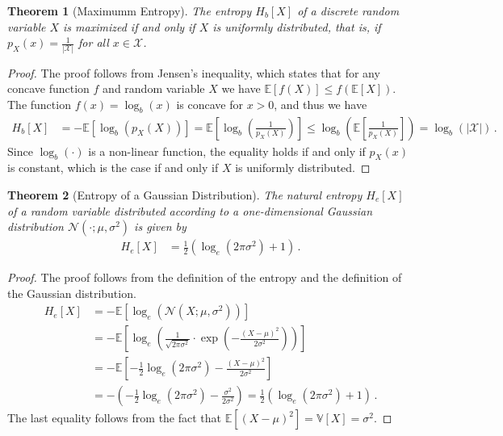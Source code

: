 \documentclass[a4paper]{article}
\newcommand{\Normal}[3]{{\mathcal N} \left({#1};{#2},{#3}\right)}
\newcommand{\expect}[1]{{\mathbb E \left[ {#1} \right]}}
\newcommand{\var}[1]{{\mathbb V \left[ {#1} \right]}}
\newtheorem{theorem}{Theorem}
\theoremstyle{definition}
\begin{document}
\begin{theorem}[Maximumm Entropy]
    The entropy $H_b[X]$ of a discrete random variable $X$ is maximized if and only if $X$ is uniformly distributed, that is, if $p_X(x) = \frac{1}{|\mathcal{X}|}$ for all $x \in \mathcal{X}$.
\end{theorem}
\begin{proof}
    The proof follows from Jensen's inequality, which states that for any concave function $f$ and random variable $X$ we have $\expect{f(X)} \leq f(\expect{X})$. The function $f(x) = \log_b(x)$ is concave for $x > 0$, and thus we have
    \begin{align}
        H_b[X] & = -\expect{\log_b(p_X(X))} = \expect{\log_b\left(\frac{1}{p_X(X)}\right)} \leq \log_b\left(\expect{\frac{1}{p_X(X)}}\right) = \log_b(|\mathcal{X}|) \,.
    \end{align}
    Since $\log_b(\cdot)$ is a non-linear function, the equality holds if and only if $p_X(x)$ is constant, which is the case if and only if $X$ is uniformly distributed.
\end{proof}


\begin{theorem}[Entropy of a Gaussian Distribution]
    The natural entropy $H_e[X]$ of a random variable distributed according to a one-dimensional Gaussian distribution $\Normal{\cdot}{\mu}{\sigma^2}$ is given by
    \begin{align}
        H_e[X] & = \frac{1}{2}\left(\log_e(2\pi\sigma^2) + 1 \right) \,.
    \end{align}
\end{theorem}
\begin{proof}
    The proof follows from the definition of the entropy and the definition of the Gaussian distribution.
    \begin{align*}
        H_e[X] & = -\expect{\log_e\left(\Normal{X}{\mu}{\sigma^2}\right)} \\
               & = -\expect{\log_e\left(\frac{1}{\sqrt{2\pi\sigma^2}} \cdot \exp \left( -\frac{(X-\mu)^2}{2\sigma^2}\right)\right)} \\
               & = -\expect{-\frac{1}{2}\log_e(2\pi\sigma^2) - \frac{(X-\mu)^2}{2\sigma^2}}  \\ 
               & = -\left(-\frac{1}{2}\log_e(2\pi\sigma^2) - \frac{\sigma^2}{2\sigma^2}\right) = \frac{1}{2}\left(\log_e(2\pi\sigma^2) + 1 \right) \,.
    \end{align*}
    The last equality follows from the fact that $\expect{(X - \mu)^2} = \var{X} = \sigma^2$.
\end{proof}
\end{document}
